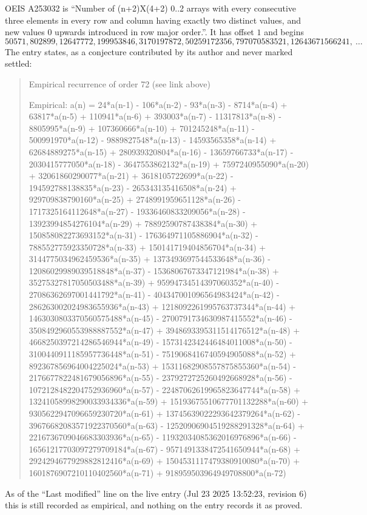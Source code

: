 \documentclass[11pt,a4paper]{article}
\theoremstyle{plain}
\theoremstyle{definition}
\begin{document}
OEIS A253032 is ``Number of (n+2)X(4+2) 0..2 arrays with every consecutive three elements in every row and column having exactly two distinct values, and new values 0 upwards introduced in row major order.''. It has offset $1$ and begins
\[
50571, 802899, 12647772, 199953846, 3170197872, 50259172356, 797070583521, 12643671566241,\ \dots
\]
The entry states, as a conjecture contributed by its author and never marked settled:
\begin{quote}
Empirical recurrence of order 72 (see link above)

Empirical: a(n) = 24*a(n-1) - 106*a(n-2) - 93*a(n-3) - 8714*a(n-4) + 63817*a(n-5) + 110941*a(n-6) + 393003*a(n-7) - 11317813*a(n-8) - 8805995*a(n-9) + 107360666*a(n-10) + 701245248*a(n-11) - 500991970*a(n-12) - 9889827548*a(n-13) - 14593565358*a(n-14) + 62684889275*a(n-15) + 280939320804*a(n-16) - 13659766733*a(n-17) - 2030415777050*a(n-18) - 3647553862132*a(n-19) + 7597240955090*a(n-20) + 32061860290077*a(n-21) + 3618105722699*a(n-22) - 194592788138835*a(n-23) - 265343135416508*a(n-24) + 929709838790160*a(n-25) + 2748991959651128*a(n-26) - 1717325164112648*a(n-27) - 19336460833209056*a(n-28) - 13923994854276104*a(n-29) + 78892590787438384*a(n-30) + 150858082273693152*a(n-31) - 176364971105886904*a(n-32) - 788552775923350728*a(n-33) + 150141719404856704*a(n-34) + 3144775034962459536*a(n-35) + 1373493697544533648*a(n-36) - 12086029989039518848*a(n-37) - 15368067673347121984*a(n-38) + 35275327817050503488*a(n-39) + 95994734514397060352*a(n-40) - 27086362697001441792*a(n-41) - 404347001096564983424*a(n-42) - 286263002024983655936*a(n-43) + 1218092261995763737344*a(n-44) + 1463030803370560575488*a(n-45) - 2700791734630987415552*a(n-46) - 3508492960553988887552*a(n-47) + 3948693395311514176512*a(n-48) + 4668250397214286546944*a(n-49) - 1573142342446484011008*a(n-50) - 3100440911185957736448*a(n-51) - 7519068416740594905088*a(n-52) + 892367856964004225024*a(n-53) + 15311682908557875855360*a(n-54) - 2176677822481679056896*a(n-55) - 2379272725260492668928*a(n-56) - 1072128482204752936960*a(n-57) - 22487062619965823647744*a(n-58) + 13241058998290033934336*a(n-59) + 15193675510677701132288*a(n-60) + 9305622947096659230720*a(n-61) + 13745639022293642379264*a(n-62) - 39676682083571922370560*a(n-63) - 12520906904519288291328*a(n-64) + 2216736709046683303936*a(n-65) - 11932034085362016976896*a(n-66) - 16561217703097279709184*a(n-67) - 9571491338472541650944*a(n-68) + 2924294677929882812416*a(n-69) + 1504531117479380910080*a(n-70) + 1601876907210110402560*a(n-71) + 918959503964949708800*a(n-72)
\end{quote}
As of the ``Last modified'' line on the live entry (Jul 23 2025 13:52:23, revision 6) this is still
recorded as empirical, and nothing on the entry records it as proved.
\end{document}
